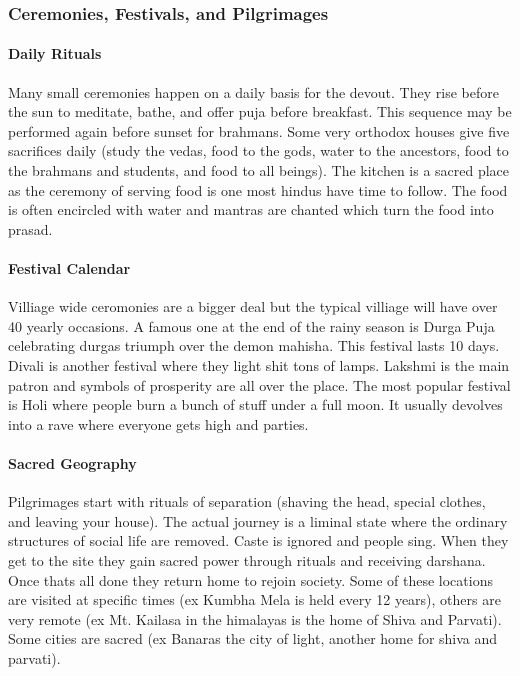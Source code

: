 \documentclass{article}
\begin{document}
\subsubsection{Ceremonies, Festivals, and Pilgrimages}
\label{ssub:ceremonies_festivals_and_pilgrimages}
\paragraph{Daily Rituals}
\label{par:daily_rituals}
Many small ceremonies happen on a daily basis for the devout. They rise before the sun to meditate, bathe, and offer puja before breakfast. This sequence may be performed again before sunset for brahmans. Some very orthodox houses give five sacrifices daily (study the vedas, food to the gods, water to the ancestors, food to the brahmans and students, and food to all beings). The kitchen is a sacred place as the ceremony of serving food is one most hindus have time to follow. The food is often encircled with water and mantras are chanted which turn the food into prasad.

\paragraph{Festival Calendar}
\label{par:festival_calendar}
Villiage wide ceromonies are a bigger deal but the typical villiage will have over 40 yearly occasions. A famous one at the end of the rainy season is Durga Puja celebrating durgas triumph over the demon mahisha. This festival lasts 10 days. Divali is another festival where they light shit tons of lamps. Lakshmi is the main patron and symbols of prosperity are all over the place. The most popular festival is Holi where people burn a bunch of stuff under a full moon. It usually devolves into a rave where everyone gets high and parties.

\paragraph{Sacred Geography}
\label{par:sacred_geography}
Pilgrimages start with rituals of separation (shaving the head, special clothes, and leaving your house). The actual journey is a liminal state where the ordinary structures of social life are removed. Caste is ignored and people sing. When they get to the site they gain sacred power through rituals and receiving darshana. Once thats all done they return home to rejoin society. Some of these locations are visited at specific times (ex Kumbha Mela is held every 12 years), others are very remote (ex Mt. Kailasa in the himalayas is the home of Shiva and Parvati). Some cities are sacred (ex Banaras the city of light, another home for shiva and parvati).
\end{document}

